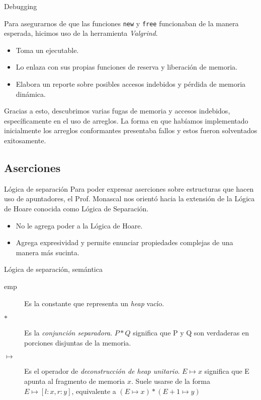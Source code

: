\begin{frame}{Debugging}

Para asegurarnos de que las funciones \texttt{new} y \texttt{free} funcionaban
de la manera esperada, hicimos uso de la herramienta \textit{Valgrind}. 
\begin{itemize}
  \item Toma un ejecutable.
  \item Lo enlaza con sus propias funciones de reserva y liberación de memoria.
  \item Elabora un reporte sobre posibles accesos indebidos y pérdida de memoria 
    dinámica.
\end{itemize}

Gracias a esto, descubrimos varias fugas de memoria y accesos indebidos, específicamente
en el uso de arreglos. La forma en que habíamos implementado inicialmente los arreglos conformantes presentaba fallos y estos fueron solventados exitosamente.
\end{frame}

\subsection*{Aserciones}
\begin{frame}{Lógica de separación}
Para poder expresar aserciones sobre estructuras que hacen uso de apuntadores, 
el Prof. Monascal nos orientó hacia la extensión de la Lógica de Hoare conocida 
como Lógica de Separación.

\begin{itemize}
  \item No le agrega poder a la Lógica de Hoare.
  \item Agrega expresividad y permite enunciar propiedades complejas de 
  una manera más sucinta.
 \end{itemize}
\end{frame}

\begin{frame}{Lógica de separación, semántica}

\begin{description}
  \item [emp] Es la constante que representa un \textit{heap} vacío. 
  \item [$*$] Es la \textit{conjunción separadora}. $P*Q$ significa que P y Q son verdaderas en porciones disjuntas de la memoria.
  \item [$\mapsto$] Es el operador de \textit{deconstrucción de heap unitario}. $E \mapsto x$ significa que E apunta al fragmento de memoria $x$. Suele usarse de la forma $E \mapsto [l : x, r : y]$, equivalente a $(E \mapsto x) * (E + 1 \mapsto y)$
\end{description}

\end{frame}

